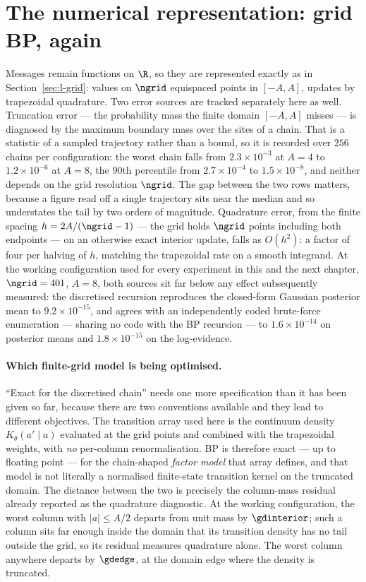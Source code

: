 \section{The numerical representation: grid BP, again}\label{sec:em-numerical}

Messages remain functions on $\R$, so they are represented exactly as in
Section~\ref{sec:l-grid}: values on $\ngrid$ equispaced points in $[-A,A]$, updates
by trapezoidal quadrature. Two error sources are tracked separately here as
well. Truncation error --- the probability mass the finite domain $[-A,A]$
misses --- is diagnosed by the maximum boundary mass over the sites of a chain.
That is a statistic of a sampled trajectory rather than a bound, so it is
recorded over $256$ chains per configuration: the worst chain falls from
$2.3\times10^{-3}$ at $A=4$ to $1.2\times10^{-6}$ at $A=8$, the $90$th
percentile from $2.7\times10^{-4}$ to $1.5\times10^{-8}$, and neither depends on
the grid resolution $\ngrid$. The gap between the two rows matters, because a figure
read off a single trajectory sits near the median and so understates the tail by
two orders of magnitude. Quadrature error, from the
finite spacing $h=2A/(\ngrid-1)$ --- the grid holds $\ngrid$ points including both
endpoints --- on an otherwise exact interior update, falls as
$O(h^2)$: a factor of four per halving of $h$, matching the trapezoidal
rate on a smooth integrand. At the working configuration used for every
experiment in this and the next chapter, $\ngrid=401$, $A=8$, both sources sit far
below any effect subsequently measured: the discretised recursion reproduces
the closed-form Gaussian posterior mean to $9.2\times10^{-15}$, and agrees
with an independently coded brute-force enumeration --- sharing no code with
the BP recursion --- to $1.6\times10^{-14}$ on posterior means and
$1.8\times10^{-15}$ on the log-evidence.

\paragraph{Which finite-grid model is being optimised.} ``Exact for the
discretised chain'' needs one more specification than it has been given so far,
because there are two conventions available and they lead to different
objectives. The transition array used here is the continuum density
$K_\theta(a' \mid a)$ evaluated at the grid points and combined with the
trapezoidal weights, with \emph{no} per-column renormalisation. BP is therefore
exact --- up to floating point --- for the chain-shaped \emph{factor model} that
array defines, and that model is not literally a normalised finite-state
transition kernel on the truncated domain. The distance between the two is
precisely the column-mass residual already reported as the quadrature
diagnostic. At the working configuration, the worst column with $|a| \le A/2$
departs from unit mass by $\gdinterior$; such a column sits far enough inside
the domain that its transition density has no tail outside the grid, so its
residual measures quadrature alone. The worst column anywhere departs by
$\gdedge$, at the domain edge where the density is truncated.

